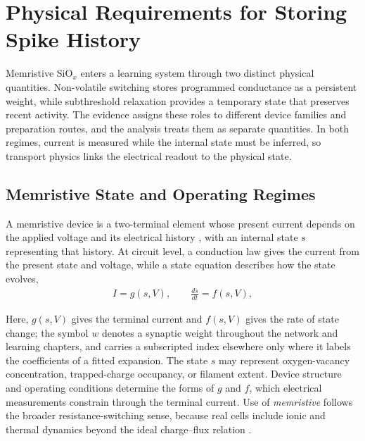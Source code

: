 \section[Physical Requirements for Storing Spike History]{Physical Requirements for Storing Spike
History}\label{sec:physical-requirements}

\noindent Memristive SiO$_x$ enters a learning system through two distinct physical quantities. Non-volatile
switching stores programmed conductance as a persistent weight, while subthreshold relaxation provides a temporary
state that preserves recent activity. The evidence assigns these roles to different device families and
preparation routes, and the analysis treats them as separate quantities. In both regimes, current is measured while the
internal state must be inferred, so transport physics links the electrical readout to the physical state.

\subsection[Memristive State and Operating Regimes]{Memristive State and Operating
Regimes}\label{subsec:regimes}

\noindent A memristive device is a two-terminal element whose present current depends on the applied voltage and
its electrical history \cite{chua1971memristor, strukov2008missing}, with an internal state $s$ representing that
history.
At circuit level, a conduction law gives the current from the present state and voltage, while a state equation
describes how the state evolves,
\begin{align}
    I = g(s, V), \qquad \frac{ds}{dt} = f(s, V), \label{eq:2.5}
\end{align}

\noindent Here, $g(s,V)$ gives the terminal current and $f(s,V)$ gives the rate of state change; the symbol $w$
denotes a synaptic weight throughout the network and learning chapters, and carries a subscripted index elsewhere
only where it labels the coefficients of a fitted expansion. The state $s$ may represent oxygen-vacancy concentration, trapped-charge occupancy,
or filament extent. Device structure and operating conditions determine the forms of $g$ and $f$, which electrical
measurements constrain through the terminal current. Use of \emph{memristive} follows the broader
resistance-switching sense, because real cells include ionic and thermal dynamics beyond the ideal charge--flux
relation \cite{chua2019resistance}.\\


